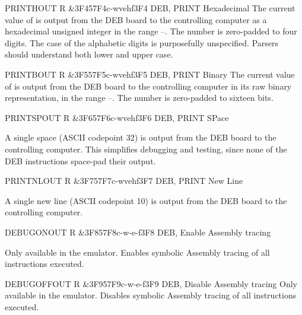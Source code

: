 \begin{extcmd}{PRINTH}{OUT R \&3F4}{57F4}{c-wvehf}{3F4}%
       {DEB, PRINT Hexadecimal}%
       {%
         The current value of \A{} is output from the \gls{DEB} board to the
         controlling computer as a hexadecimal unsigned integer in the range
         –. The number is zero-padded to four digits. The
         case of the alphabetic digits is purposefully unspecified. Parsers
         should understand both lower and upper case.
       }
\end{extcmd}

\begin{extcmd}{PRINTB}{OUT R \&3F5}{57F5}{c-wvehf}{3F5}%
       {DEB, PRINT Binary}%
       {%
         The current value of \A{} is output from the \gls{DEB} board to the
         controlling computer in its raw binary representation, in the range
         –. The number is
         zero-padded to sixteen bits.
       }
\end{extcmd}

\begin{extcmd}{PRINTSP}{OUT R \&3F6}{57F6}{c-wvehf}{3F6}%
       {DEB, PRINT SPace}%
       {%
         A single space (ASCII codepoint 32) is output from the \gls{DEB} board
         to the controlling computer. This simplifies debugging and testing,
         since none of the \gls{DEB} instructions space-pad their output.

       }
\end{extcmd}

\begin{extcmd}{PRINTNL}{OUT R \&3F7}{57F7}{c-wvehf}{3F7}%
       {DEB, PRINT New Line}%
       {%
         A single new line (ASCII codepoint 10) is output from the \gls{DEB} board
         to the controlling computer.

       }
\end{extcmd}

\begin{extcmd}{DEBUGON}{OUT R \&3F8}{57F8}{c-w-e-f}{3F8}%
       {DEB, Enable Assembly tracing}%
       {%
         Only available in the emulator. Enables symbolic \gls{Assembly} tracing of all
         instructions executed.

       }
\end{extcmd}

\begin{extcmd}{DEBUGOFF}{OUT R \&3F9}{57F9}{c-w-e-f}{3F9}%
       {DEB, Disable Assembly tracing}%
       {%
         Only available in the emulator. Disables symbolic \gls{Assembly} tracing of all
         instructions executed.
       }
\end{extcmd}

